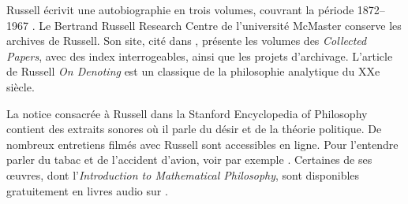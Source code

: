 \documentclass[../../../include/open-logic-section]{subfiles}
\begin{document}
\begin{reading}
Russell écrivit une autobiographie en trois volumes, couvrant la
période 1872--1967 \citep{Russell1967,Russell1968,Russell1969}.
Le Bertrand Russell Research Centre de l'université McMaster conserve
les archives de Russell. Son site, cité dans \citet{Duncan2015},
présente les volumes des \emph{Collected Papers}, avec des index
interrogeables, ainsi que les projets d'archivage. L'article de
Russell \emph{On Denoting} \citep{Russell1905} est un classique de la
philosophie analytique du XXe siècle.

La notice consacrée à Russell dans la Stanford Encyclopedia of
Philosophy \citep{Irvine2015} contient des extraits sonores où il
parle du désir et de la théorie politique. De nombreux entretiens
filmés avec Russell sont accessibles en ligne. Pour l'entendre parler
du tabac et de l'accident d'avion, voir par exemple \citet{RussellND}.
Certaines de ses œuvres, dont l'\emph{Introduction to Mathematical
Philosophy}, sont disponibles gratuitement en livres audio sur
\citet{LibriVoxND}.
\end{reading}
\end{document}

